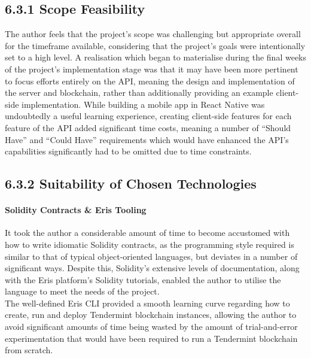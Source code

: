 \subsection{6.3.1 Scope Feasibility}\label{scope-feasibility}

The author feels that the project's scope was challenging but
appropriate overall for the timeframe available, considering that the
project's goals were intentionally set to a high level. A realisation
which began to materialise during the final weeks of the project's
implementation stage was that it may have been more pertinent to focus
efforts entirely on the API, meaning the design and implementation of
the server and blockchain, rather than additionally providing an example
client-side implementation. While building a mobile app in React Native
was undoubtedly a useful learning experience, creating client-side
features for each feature of the API added significant time costs,
meaning a number of ``Should Have'' and ``Could Have'' requirements
which would have enhanced the API's capabilities significantly had to be
omitted due to time constraints.

\subsection{6.3.2 Suitability of Chosen
Technologies}\label{suitability-of-chosen-technologies}

\paragraph{Solidity Contracts \& Eris
Tooling}\label{solidity-contracts-eris-tooling}

It took the author a considerable amount of time to become accustomed
with how to write idiomatic Solidity contracts, as the programming style
required is similar to that of typical object-oriented languages, but
deviates in a number of significant ways. Despite this, Solidity's
extensive levels of documentation, along with the Eris platform's
Solidity tutorials, enabled the author to utilise the language to meet
the needs of the project.\\
The well-defined Eris CLI provided a smooth learning curve regarding how
to create, run and deploy Tendermint blockchain instances, allowing the
author to avoid significant amounts of time being wasted by the amount
of trial-and-error experimentation that would have been required to run
a Tendermint blockchain from scratch.

